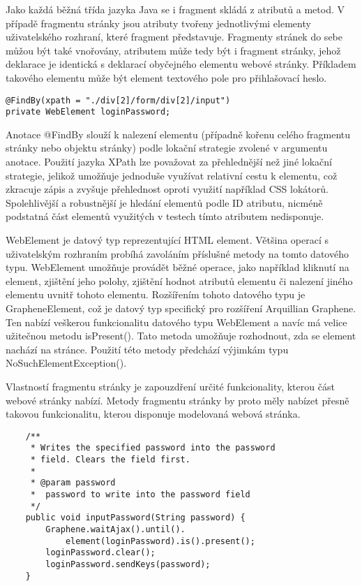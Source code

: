 \documentclass[
    color,   %
	table,   %
    twoside, %
]{fithesis3}
\begin{document}
Jako každá běžná třída jazyka Java se i fragment skládá z atributů a metod. V případě fragmentu stránky jsou atributy tvořeny jednotlivými elementy uživatelského rozhraní, které fragment představuje. Fragmenty stránek do sebe můžou být také vnořovány, atributem může tedy být i fragment stránky, jehož deklarace je identická s deklarací obyčejného elementu webové stránky. Příkladem takového elementu může být element textového pole pro přihlašovací heslo. 

\begin{lstlisting}
@FindBy(xpath = "./div[2]/form/div[2]/input")
private WebElement loginPassword;
\end{lstlisting} 

Anotace @FindBy slouží k nalezení elementu (případně kořenu celého fragmentu stránky nebo objektu stránky) podle lokační strategie zvolené v argumentu anotace. Použití jazyka XPath lze považovat za přehlednější než jiné lokační strategie, jelikož umožňuje jednoduše využívat relativní cestu k elementu, což zkracuje zápis a zvyšuje přehlednost oproti využití například CSS lokátorů. Spolehlivější a robustnější je hledání elementů podle ID atributu, nicméně podstatná část elementů využitých v testech tímto atributem nedisponuje.

WebElement je datový typ reprezentující HTML element. Většina operací s uživatelským rozhraním probíhá zavoláním příslušné metody na tomto datového typu. WebElement umožňuje provádět běžné operace, jako například kliknutí na element, zjištění jeho polohy, zjištění hodnot atributů elementu či nalezení jiného elementu uvnitř tohoto elementu. Rozšířením tohoto datového typu je GrapheneElement, což je datový typ specifický pro rozšíření Arquillian Graphene. Ten nabízí veškerou funkcionalitu datového typu WebElement a navíc má velice užitečnou metodu isPresent(). Tato metoda umožňuje rozhodnout, zda se element nachází na stránce. Použití této metody předchází výjimkám typu NoSuchElementException().

Vlastností fragmentu stránky je zapouzdření určité funkcionality, kterou část webové stránky nabízí. Metody fragmentu stránky by proto měly nabízet přesně takovou funkcionalitu, kterou disponuje modelovaná webová stránka.

\begin{lstlisting}
	/**
	 * Writes the specified password into the password 
	 * field. Clears the field first.
	 * 
	 * @param password
	 * 	password to write into the password field
	 */
	public void inputPassword(String password) {
		Graphene.waitAjax().until().
			element(loginPassword).is().present();
		loginPassword.clear();
		loginPassword.sendKeys(password);
	}
\end{lstlisting} 
\end{document}
